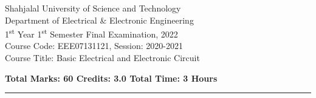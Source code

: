 
\begin{center}
	\Large{Shahjalal University of Science and Technology}\\
	\large{Department of Electrical \& Electronic Engineering}\\
	1\textsuperscript{st} Year 1\textsuperscript{st} Semester Final Examination, 2022\\
	Course Code: EEE07131121, Session: 2020-2021\\
	Course Title: Basic Electrical and Electronic Circuit\\
	
	
	
\end{center}

\vspace{-2mm}
\begin{flushleft}
\large{\bfseries Total Marks: 60  \hspace{42mm} Credits: 3.0 \hfill Total Time: 3 Hours}
\end{flushleft}
\vspace{-6mm}
\noindent\rule{\textwidth}{2pt}

